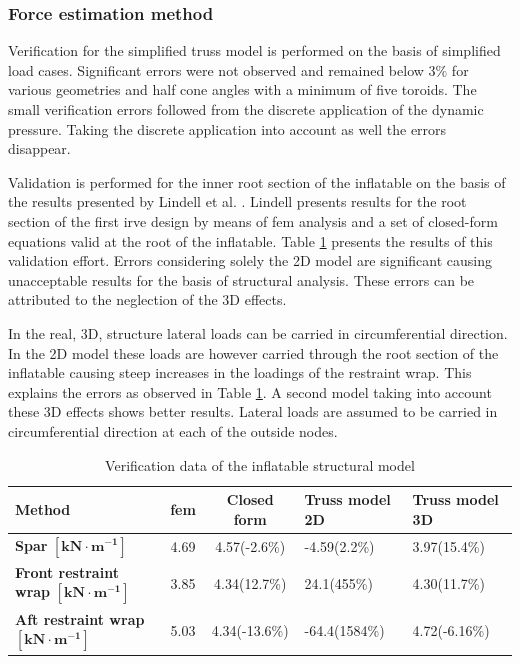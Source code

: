 \subsubsection{Force estimation method}

Verification for the simplified truss model is performed on the basis of simplified load cases. Significant errors were not observed and remained below $3\%$ for various geometries and half cone angles with a minimum of five toroids. The small verification errors followed from the discrete application of the dynamic pressure. Taking the discrete application into account as well the errors disappear.

Validation is performed for the inner root section of the inflatable on the basis of the results presented by Lindell et al. \cite{Lindell2006}. Lindell presents results for the root section of the first \gls{irve} design by means of \gls{fem} analysis and a set of closed-form equations valid at the root of the inflatable. Table \ref{tab:struc_val} presents the results of this validation effort. Errors considering solely the 2D model are significant causing unacceptable results for the basis of structural analysis. These errors can be attributed to the neglection of the 3D effects. 

In the real, 3D, structure lateral loads can be carried in circumferential direction. In the 2D model these loads are however carried through the root section of the inflatable causing steep increases in the loadings of the restraint wrap. This explains the errors as observed in Table \ref{tab:struc_val}. A second model taking into account these 3D effects shows better results. Lateral loads are assumed to be carried in circumferential direction at each of the outside nodes. 

\begin{table}[h]
\centering
\caption{Verification data of the inflatable structural model}
\begin{tabular}{|p{3.6cm}||c|c|p{2.5cm}|p{2.5cm}|} \hline
\textbf{Method}                            & \gls{fem} \cite{Lindell2006} & Closed form \cite{Lindell2006} & Truss model 2D & Truss model 3D \\ \hline
\textbf{Spar} $\mathbf{[kN\cdot m^{-1}]}$& 4.69                     & 4.57(-2.6\%)                     & -4.59(2.2\%)   & 3.97(15.4\%)   \\ \hline
\textbf{Front restraint wrap} $\mathbf{[kN\cdot m^{-1}]}$& 3.85                     & 4.34(12.7\%)                     & 24.1(455\%)    & 4.30(11.7\%)   \\ \hline
\textbf{Aft restraint wrap} $\mathbf{[kN\cdot m^{-1}]}$& 5.03                     & 4.34(-13.6\%)                    & -64.4(1584\%)  & 4.72(-6.16\%) \\ \hline
\end{tabular}
\label{tab:struc_val} 
\end{table}


